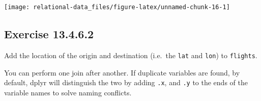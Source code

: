\documentclass[]{book}
\newenvironment{Shaded}{\begin{snugshade}}{\end{snugshade}}
\newcommand{\CommentTok}[1]{\textcolor[rgb]{0.56,0.35,0.01}{\textit{#1}}}
\newcommand{\DataTypeTok}[1]{\textcolor[rgb]{0.13,0.29,0.53}{#1}}
\newcommand{\KeywordTok}[1]{\textcolor[rgb]{0.13,0.29,0.53}{\textbf{#1}}}
\newcommand{\NormalTok}[1]{#1}
\newcommand{\OperatorTok}[1]{\textcolor[rgb]{0.81,0.36,0.00}{\textbf{#1}}}
\newcommand{\OtherTok}[1]{\textcolor[rgb]{0.56,0.35,0.01}{#1}}
\newcommand{\StringTok}[1]{\textcolor[rgb]{0.31,0.60,0.02}{#1}}
\theoremstyle{plain}
\theoremstyle{remark}
\begin{document}
\begin{Shaded}
\end{Shaded}

\begin{center}\texttt{[image: relational-data\_files/figure-latex/unnamed-chunk-16-1]} \end{center}

\hypertarget{exercise-13.4.6.2}{%
\subsection*{\texorpdfstring{Exercise
{13.4.6.2}}{Exercise 13.4.6.2}}\label{exercise-13.4.6.2}}

Add the location of the origin and destination (i.e.~the \texttt{lat}
and \texttt{lon}) to \texttt{flights}.

You can perform one join after another. If duplicate variables are
found, by default, dplyr will distinguish the two by adding \texttt{.x},
and \texttt{.y} to the ends of the variable names to solve naming
conflicts.
\end{document}
